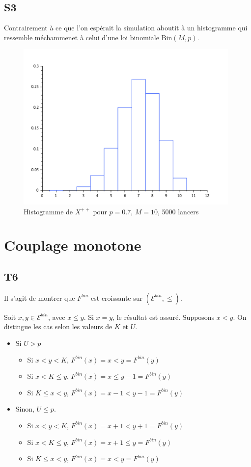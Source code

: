 \documentclass[a4paper,11pt]{article}
\def \E{\mathcal{E}}
\begin{document}
\subsection*{S3}
Contrairement à ce que l'on espérait la simulation aboutit à un histogramme qui ressemble méchammenet à celui d'une loi binomiale $\text{Bin}(M,p)$.
\begin{figure}[h]
\center
\includegraphics[width=11cm]{S3}
\caption{Histogramme de $X^{++}$ pour $p=0.7$, $M=10$, 5000 lancers}
\label{S3}

\end{figure}


\section{Couplage monotone}

\subsection*{T6}

Il s'agit de montrer que $F^{bin}$ est croissante sur $(\E^{bin},\le)$.

Soit $x,y \in \E^{bin}$, avec $x\le y$. Si $x=y$, le résultat est assuré. Supposons $x<y$. On distingue les cas selon les valeurs de $K$ et $U$. 
\vspace{0.5cm}

\begin{itemize}
\item[\textbullet] Si $U>p$
	\begin{itemize}
	\item Si $x<y<K$, $F^{bin}(x) = x < y = F^{bin}(y)$
	\item Si $x<K\le y$, $F^{bin}(x) = x \le y-1 = F^{bin}(y)$
	\item Si $K\le x < y$, $F^{bin}(x) = x - 1 < y - 1 = F^{bin}(y)$
	\end{itemize}
\item[\textbullet] Sinon, $U\le p$.
	\begin{itemize}
	\item Si $x<y<K$, $F^{bin}(x) = x + 1 < y + 1= F^{bin}(y)$
	\item Si $x<K\le y$, $F^{bin}(x) = x +1 \le y = F^{bin}(y)$
	\item Si $K\le x < y$, $F^{bin}(x) = x < y = F^{bin}(y)$
	\end{itemize}
\end{itemize}
\end{document}
